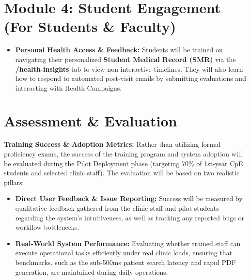 \section{Module 4: Student Engagement (For Students \& Faculty)}

\begin{itemize}
    \item \textbf{Personal Health Access \& Feedback:} Students will be trained on navigating their personalized \textbf{Student Medical Record (SMR)} via the \textbf{/health-insights} tab to view non-interactive timelines. They will also learn how to respond to automated post-visit emails by submitting evaluations and interacting with Health Campaigns.
\end{itemize}

\section{Assessment \& Evaluation}

\textbf{Training Success \& Adoption Metrics:} Rather than utilizing formal proficiency exams, the success of the training program and system adoption will be evaluated during the Pilot Deployment phase (targeting 70\% of 1st-year CpE students and selected clinic staff). The evaluation will be based on two realistic pillars:

\begin{itemize}
    \item \textbf{Direct User Feedback \& Issue Reporting:} Success will be measured by qualitative feedback gathered from the clinic staff and pilot students regarding the system's intuitiveness, as well as tracking any reported bugs or workflow bottlenecks.
    \item \textbf{Real-World System Performance:} Evaluating whether trained staff can execute operational tasks efficiently under real clinic loads, ensuring that benchmarks, such as the sub-500ms patient search latency and rapid PDF generation, are maintained during daily operations.
\end{itemize}
